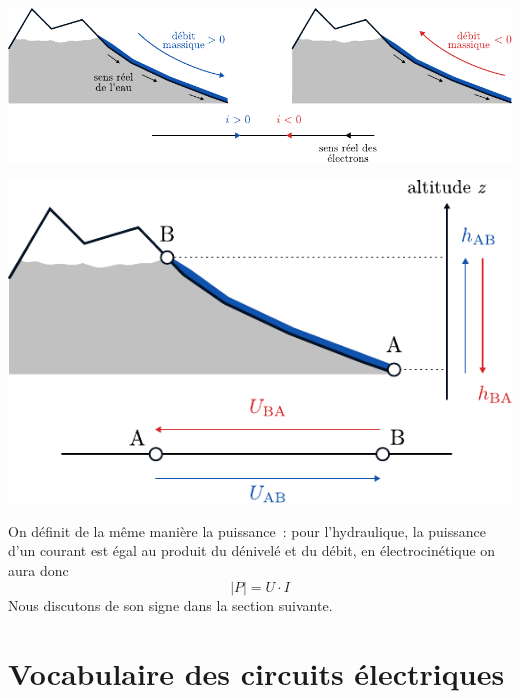 \documentclass[../../main/main.tex]{subfiles}
\begin{document}
\smallbreak
\noindent
\begin{minipage}[c]{.58\linewidth}
	\begin{center}
		\includegraphics[width=\linewidth]{anal_elec_debit}
	\end{center}
\end{minipage}
\hfill
\begin{minipage}[c]{.40\linewidth}
	\begin{center}
		\includegraphics[width=\linewidth]{anal_elec_pot}
	\end{center}
\end{minipage}

\smallbreak
On définit de la même manière la puissance~: pour l'hydraulique, la puissance
d'un courant est égal au produit du dénivelé et du débit, en
électrocinétique on aura donc
\[\boxed{\left| P \right| = U\cdot I}\]
Nous discutons de son signe dans la section suivante.

\section{Vocabulaire des circuits électriques}
\end{document}
